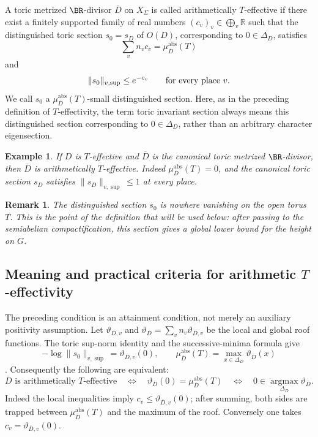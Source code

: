 \documentclass[10pt,a4paper]{amsart}
\theoremstyle{plain}
\newtheorem{example}[theorem]{Example}
\newtheorem{remark}[theorem]{Remark}
\theoremstyle{plain}
\numberwithin{equation}{section}
\providecommand{\bD}{\overline{D}}
\providecommand{\muabs}{\mu^{\mathrm{abs}}}
\begin{document}
\begin{defn}\label{def:arith-T-effective}
	A toric metrized \(\BR\)-divisor \(\bD\) on \(X_\Sigma\) is called
	arithmetically \(T\)-effective if there exist a finitely supported family of
	real numbers \((c_v)_v\in\bigoplus_v\mathbb R\) such that the
	distinguished toric section \(s_0=s_D\) of \(O(D)\), corresponding to
	\(0\in\Delta_D\), satisfies
	\[
	\sum_vn_vc_v=\muabs_{\bD}(T)
	\]
	and
	\[
	\|s_0\|_{v,\sup}\le e^{-c_v}
	\qquad\hbox{for every place }v.
	\]
	We call \(s_0\) a \(\muabs_{\bD}(T)\)-small distinguished section.
	Here, as in the preceding definition of \(T\)-effectivity, the term
	toric invariant section always means this distinguished section
	corresponding to \(0\in\Delta_D\), rather than an arbitrary character
	eigensection.
\end{defn}

\begin{example}
	If \(D\) is \(T\)-effective and \(\bD\) is the canonical toric metrized
	\(\BR\)-divisor, then \(\bD\) is arithmetically \(T\)-effective.  Indeed
	\(\muabs_{\bD}(T)=0\), and the canonical toric section \(s_D\) satisfies
	\(\|s_D\|_{v,\sup}\le1\) at every place.
\end{example}

\begin{remark}
	The distinguished section \(s_0\) is nowhere vanishing on the open
	torus \(T\).  This is the point of the definition that will be used below:
	after passing to the semiabelian compactification, this section gives a
	global lower bound for the height on \(G\).
\end{remark}

\subsection{Meaning and practical criteria for arithmetic \(T\)-effectivity}
\label{subsec:arith-teff-meaning}

The preceding condition is an attainment condition, not merely an auxiliary
positivity assumption.  Let \(\vartheta_{\bD,v}\) and
\(\vartheta_{\bD}=\sum_vn_v\vartheta_{\bD,v}\) be the local and global roof
functions.  The toric sup-norm identity and the successive-minima formula give
\[
-\log\|s_0\|_{v,\sup}=\vartheta_{\bD,v}(0),\qquad
\muabs_{\bD}(T)=\max_{x\in\Delta_D}\vartheta_{\bD}(x)
\]
\cite[Chapters 4--5]{BPS14}\cite[Theorem 3.9 and Corollary 3.10]{BGPS15}.
Consequently the following are equivalent:
\[
\bD\text{ is arithmetically \(T\)-effective}
\quad\Longleftrightarrow\quad
\vartheta_{\bD}(0)=\muabs_{\bD}(T)
\quad\Longleftrightarrow\quad
0\in\operatorname*{argmax}_{\Delta_D}\vartheta_{\bD}.
\]
Indeed the local inequalities imply
\(c_v\le\vartheta_{\bD,v}(0)\); after summing, both sides are trapped between
\(\muabs_{\bD}(T)\) and the maximum of the roof.  Conversely one takes
\(c_v=\vartheta_{\bD,v}(0)\).
\end{document}
